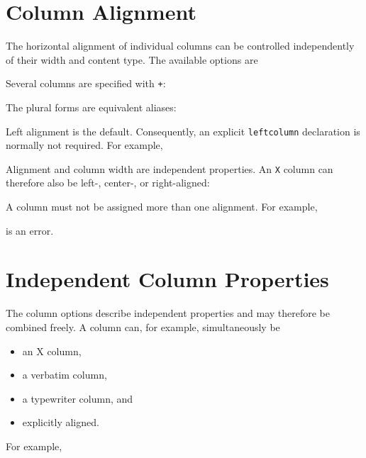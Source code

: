\documentclass[
11pt,
a4paper,
oneside
]{scrbook}
\begin{document}
\section{Column Alignment}

The horizontal alignment of individual columns can be controlled
independently of their width and content type.
The available options are




Several columns are specified with \texttt{+}:




The plural forms are equivalent aliases:




Left alignment is the default. Consequently, an explicit
\texttt{leftcolumn} declaration is normally not required.
For example,






\noindent Alignment and column width are independent properties. An \texttt{X} column
can therefore also be left-, center-, or right-aligned:




A column must not be assigned more than one alignment. For example,




is an error.

\section{Independent Column Properties}

The column options describe independent properties and may therefore be
combined freely.
A column can, for example, simultaneously be
\begin{itemize}
	\item an X column,
	\item a verbatim column,
	\item a typewriter column, and
	\item explicitly aligned.
\end{itemize}
For example,
\end{document}
